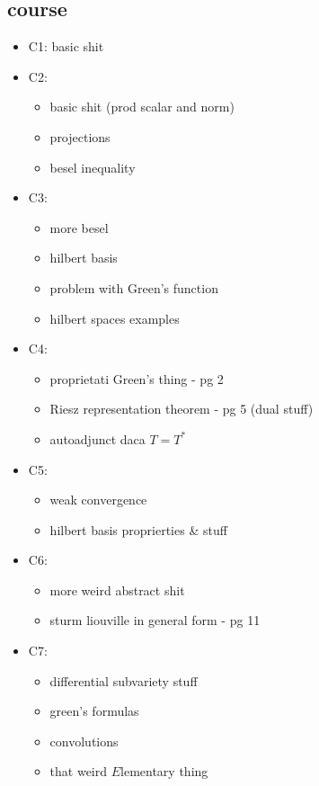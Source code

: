 \documentclass[11pt]{article}
\begin{document}
\subsection*{course}
\label{sec:org2209394}
\begin{itemize}
\item C1: basic shit
\item C2: 
\begin{itemize}
\item basic shit (prod scalar and norm)
\item projections
\item besel inequality
\end{itemize}
\item C3:
\begin{itemize}
\item more besel
\item hilbert basis
\item problem with Green's function
\item hilbert spaces examples
\end{itemize}
\item C4:
\begin{itemize}
\item proprietati Green's thing - pg 2
\item Riesz  representation theorem - pg 5 (dual stuff)
\item autoadjunct daca \(T = T^*\)
\end{itemize}
\item C5:
\begin{itemize}
\item weak convergence
\item hilbert basis proprierties \& stuff
\end{itemize}
\item C6: 
\begin{itemize}
\item more weird abstract shit
\item sturm liouville in general form - pg 11
\end{itemize}
\item C7:
\begin{itemize}
\item differential subvariety stuff
\item green's formulas
\item convolutions
\item that weird \(E\)lementary thing
\end{itemize}
\end{itemize}
\end{document}
